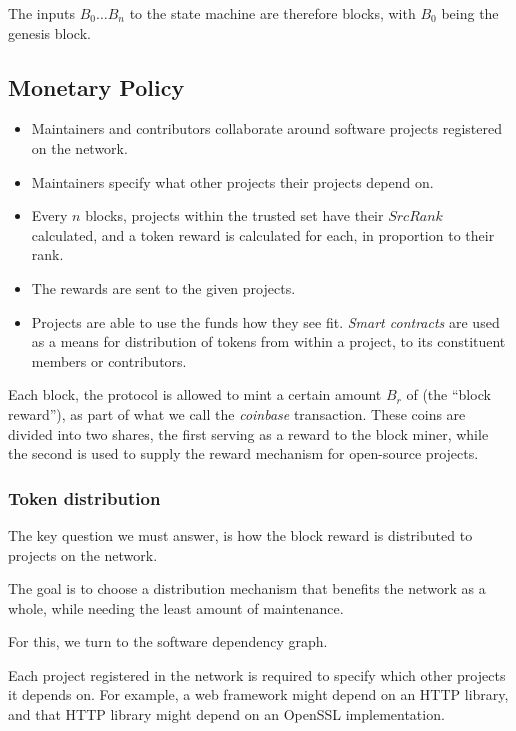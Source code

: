 The inputs $B_0 \dotso B_n$ to the state machine are therefore blocks, with
$B_0$ being the genesis block.


\subsection{Monetary Policy}

\begin{itemize}
    \item Maintainers and contributors collaborate around software projects
        registered on the network.
    \item Maintainers specify what other projects their projects depend on.
    \item Every $n$ blocks, projects within the trusted set have their $SrcRank$
        calculated, and a token reward is calculated for each, in proportion
        to their rank.
    \item The rewards are sent to the given projects.
    \item Projects are able to use the funds how they see fit. \emph{Smart
        contracts} are used as a means for distribution of tokens from within a
        project, to its constituent members or contributors.
\end{itemize}

Each block, the protocol is allowed to mint a certain amount $B_r$ of \oscoin{}
(the ``block reward''), as part of what we call the \emph{coinbase}
transaction. These coins are divided into two shares, the first serving as a
reward to the block miner, while the second is used to supply the reward
mechanism for open-source projects.

\subsubsection{Token distribution}

The key question we must answer, is how the block reward is distributed to
projects on the network.

The goal is to choose a distribution mechanism that benefits the network as a
whole, while needing the least amount of maintenance.

For this, we turn to the software dependency graph.

Each project registered in the network is required to specify which other
projects it depends on. For example, a web framework might depend on an HTTP
library, and that HTTP library might depend on an OpenSSL implementation.

